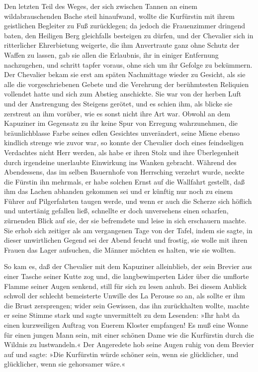 Den letzten Teil des Weges, der sich zwischen Tannen an einem
wildabrauschenden Bache steil hinaufwand, wollte die Kurfürstin mit
ihrem geistlichen Begleiter zu Fuß zurücklegen; da jedoch die
Frauenzimmer dringend baten, den Heiligen Berg gleichfalls
besteigen zu dürfen, und der Chevalier sich in ritterlicher
Ehrerbietung weigerte, die ihm Anvertraute ganz ohne Schutz der
Waffen zu lassen, gab sie allen die Erlaubnis, ihr in einiger
Entfernung nachzugehen, und schritt tapfer voraus, ohne sich um ihr
Gefolge zu bekümmern. Der Chevalier bekam sie erst am späten
Nachmittage wieder zu Gesicht, als sie alle die vorgeschriebenen
Gebete und die Verehrung der berühmtesten Reliquien vollendet hatte
und sich zum Abstieg anschickte. Sie war von der herben Luft und
der Anstrengung des Steigens gerötet, und es schien ihm, als blicke
sie zerstreut an ihm vorüber, wie es sonst nicht ihre Art war.
Obwohl an dem Kapuziner im Gegensatz zu ihr keine Spur von Erregung
wahrzunehmen, die bräunlichblasse Farbe seines edlen Gesichtes
unverändert, seine Miene ebenso kindlich strenge wie zuvor war, so
konnte der Chevalier doch eines \pagenum{[111]} feindseligen
Verdachtes nicht Herr werden, als habe er ihren Stolz und ihre
Überlegenheit durch irgendeine unerlaubte Einwirkung ins Wanken
gebracht. Während des Abendessens, das im selben Bauernhofe von
Herrsching verzehrt wurde, neckte die Fürstin ihn mehrmals, er habe
solchen Ernst auf die Wallfahrt gestellt, daß ihm das Lachen
abhanden gekommen sei und er künftig nur noch zu einem Führer auf
Pilgerfahrten taugen werde, und wenn er auch die Scherze sich
höflich und untertänig gefallen ließ, schnellte er doch unversehens
einen scharfen, zürnenden Blick auf sie, der sie befremdete und
leise in sich erschauern machte. Sie erhob sich zeitiger als am
vergangenen Tage von der Tafel, indem sie sagte, in dieser
unwirtlichen Gegend sei der Abend feucht und frostig, sie wolle mit
ihren Frauen das Lager aufsuchen, die Männer möchten es halten, wie
sie wollten.

So kam es, daß der Chevalier mit dem Kapuziner alleinblieb, der
sein Brevier aus einer Tasche seiner Kutte zog und, die
langbewimperten Lider über die umflorte Flamme seiner Augen
senkend, still für sich zu lesen anhub. Bei diesem Anblick schwoll
der schlecht bemeisterte Unwille des La Perouse so an, als sollte
er ihm die Brust zersprengen; wider sein Gewissen, das ihn
zurückhalten wollte, machte er seine Stimme stark und sagte
unvermittelt zu dem Lesenden: »Ihr habt da einen kurzweiligen
Auftrag von Euerem Kloster empfangen! Es muß eine Wonne für einen
jungen Mann sein, mit einer schönen Dame wie die Kurfürstin durch
die Wildnis zu lustwandeln.« Der Angeredete hob seine Augen ruhig
von dem Brevier auf und sagte: »Die Kurfürstin würde schöner sein,
wenn sie glücklicher, und glücklicher, wenn sie gehorsamer wäre.«

